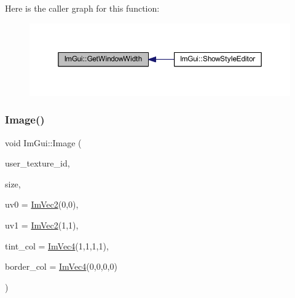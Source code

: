 Here is the caller graph for this function\+:
\nopagebreak
\begin{figure}[H]
\begin{center}
\leavevmode
\includegraphics[width=350pt]{namespace_im_gui_a471ff23945b99541c506dbdc2a9004cf_icgraph}
\end{center}
\end{figure}
\mbox{\label{namespace_im_gui_ad8705ac3b718c1b2e84e7b8c34f90249}} 
\subsubsection{\texorpdfstring{Image()}{Image()}}
{\footnotesize\ttfamily void Im\+Gui\+::\+Image (\begin{DoxyParamCaption}\item[{\mbox{\hyperlink{imgui_8h_a364f4447ecbc4ca176145ccff9db6286}{Im\+Texture\+ID}}}]{user\+\_\+texture\+\_\+id,  }\item[{const \mbox{\hyperlink{struct_im_vec2}{Im\+Vec2}} \&}]{size,  }\item[{const \mbox{\hyperlink{struct_im_vec2}{Im\+Vec2}} \&}]{uv0 = {\ttfamily \mbox{\hyperlink{struct_im_vec2}{Im\+Vec2}}(0,0)},  }\item[{const \mbox{\hyperlink{struct_im_vec2}{Im\+Vec2}} \&}]{uv1 = {\ttfamily \mbox{\hyperlink{struct_im_vec2}{Im\+Vec2}}(1,1)},  }\item[{const \mbox{\hyperlink{struct_im_vec4}{Im\+Vec4}} \&}]{tint\+\_\+col = {\ttfamily \mbox{\hyperlink{struct_im_vec4}{Im\+Vec4}}(1,1,1,1)},  }\item[{const \mbox{\hyperlink{struct_im_vec4}{Im\+Vec4}} \&}]{border\+\_\+col = {\ttfamily \mbox{\hyperlink{struct_im_vec4}{Im\+Vec4}}(0,0,0,0)} }\end{DoxyParamCaption})}

